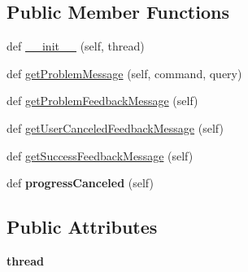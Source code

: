 \subsection*{Public Member Functions}
\begin{DoxyCompactItemize}
\item 
def \mbox{\hyperlink{class_dsg_tools_1_1_factories_1_1_thread_factory_1_1postgis_db_thread_1_1_postgis_db_messages_afad38173b816b6b5c95c2f63b8133ad9}{\+\_\+\+\_\+init\+\_\+\+\_\+}} (self, thread)
\item 
def \mbox{\hyperlink{class_dsg_tools_1_1_factories_1_1_thread_factory_1_1postgis_db_thread_1_1_postgis_db_messages_a1aa75f57927e9ab853c8e6a82d455068}{get\+Problem\+Message}} (self, command, query)
\item 
def \mbox{\hyperlink{class_dsg_tools_1_1_factories_1_1_thread_factory_1_1postgis_db_thread_1_1_postgis_db_messages_a4e008f1baa39a7252c2ef2b030cdd367}{get\+Problem\+Feedback\+Message}} (self)
\item 
def \mbox{\hyperlink{class_dsg_tools_1_1_factories_1_1_thread_factory_1_1postgis_db_thread_1_1_postgis_db_messages_a330283886226815b7abc36f9b091bc62}{get\+User\+Canceled\+Feedback\+Message}} (self)
\item 
def \mbox{\hyperlink{class_dsg_tools_1_1_factories_1_1_thread_factory_1_1postgis_db_thread_1_1_postgis_db_messages_a6b803c58e0b8614b609ccbe8d6c26167}{get\+Success\+Feedback\+Message}} (self)
\item 
\mbox{\label{class_dsg_tools_1_1_factories_1_1_thread_factory_1_1postgis_db_thread_1_1_postgis_db_messages_a0b5138b8d60bb26ea941655fc26d6974}} 
def {\bfseries progress\+Canceled} (self)
\end{DoxyCompactItemize}
\subsection*{Public Attributes}
\begin{DoxyCompactItemize}
\item 
\mbox{\label{class_dsg_tools_1_1_factories_1_1_thread_factory_1_1postgis_db_thread_1_1_postgis_db_messages_a74fcc3b449895e98bd0d3fe20f63eb01}} 
{\bfseries thread}
\end{DoxyCompactItemize}


